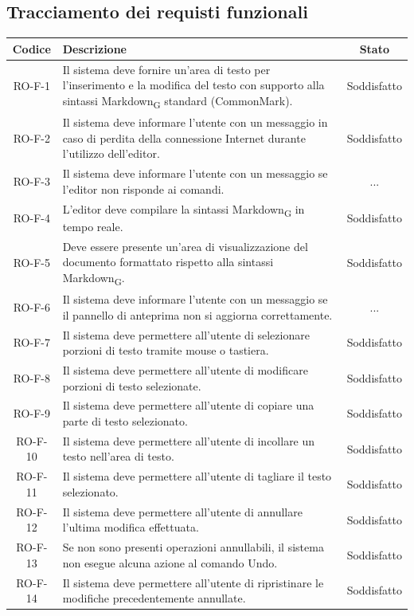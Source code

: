 \documentclass[11pt,a4paper]{article}
\newcommand{\gls}[1]{#1\textsubscript{G}}
\begin{document}
\subsection{Tracciamento dei requisti funzionali}
\begin{longtable}{|c|p{11cm}|c|}
\hline
\textbf{Codice} & \textbf{Descrizione} & \textbf{Stato}\\
\hline
\endhead
RO-F-1 & Il sistema deve fornire un’area di testo per l’inserimento e la modifica del testo con supporto alla sintassi \gls{Markdown} standard (CommonMark).& Soddisfatto\\
\hline
RO-F-2 & Il sistema deve informare l’utente con un messaggio in caso di perdita della connessione Internet durante l’utilizzo dell’editor. & Soddisfatto\\
\hline
RO-F-3 & Il sistema deve informare l’utente con un messaggio se l’editor non risponde ai comandi.& ...\\
\hline
RO-F-4 & L'editor deve compilare la sintassi \gls{Markdown} in tempo reale. & Soddisfatto\\
\hline
RO-F-5 & Deve essere presente un'area di visualizzazione del documento formattato rispetto alla sintassi \gls{Markdown}. & Soddisfatto \\
\hline
RO-F-6 & Il sistema deve informare l'utente con un messaggio se il pannello di anteprima non si aggiorna correttamente. & ... \\
\hline
RO-F-7 & Il sistema deve permettere all'utente di selezionare porzioni di testo tramite mouse o tastiera. & Soddisfatto \\
\hline
RO-F-8 & Il sistema deve permettere all'utente di modificare porzioni di testo selezionate. & Soddisfatto \\
\hline
RO-F-9 & Il sistema deve permettere all'utente di copiare una parte di testo selezionato. & Soddisfatto \\
\hline
RO-F-10 & Il sistema deve permettere all'utente di incollare un testo nell'area di testo. & Soddisfatto \\
\hline
RO-F-11 & Il sistema deve permettere all'utente di tagliare il testo selezionato. & Soddisfatto \\
\hline
RO-F-12 & Il sistema deve permettere all'utente di annullare l'ultima modifica effettuata. & Soddisfatto \\
\hline
RO-F-13 & Se non sono presenti operazioni annullabili, il sistema non esegue alcuna azione al comando Undo. & Soddisfatto \\
\hline
RO-F-14 & Il sistema deve permettere all'utente di ripristinare le modifiche precedentemente annullate. & Soddisfatto \\

\end{longtable}
\end{document}
